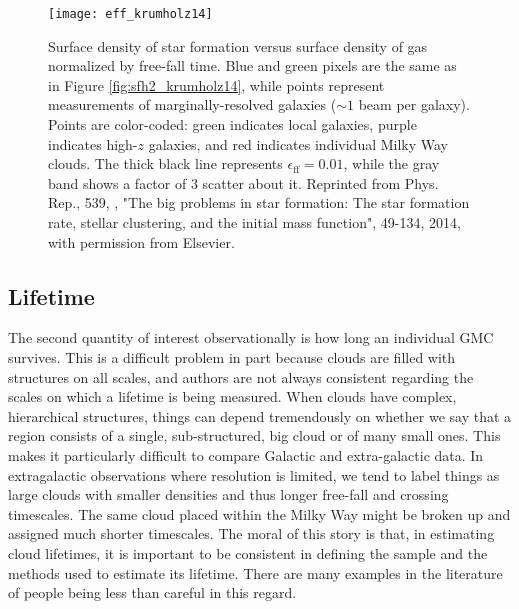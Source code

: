 \begin{figure}
\texttt{[image: eff\_krumholz14]}
\caption[Surface density of star formation versus surface density of gas normalized by free-fall time]{
\label{fig:eff_krumholz14}
Surface density of star formation versus surface density of gas normalized by free-fall time. Blue and green pixels are the same as in Figure \ref{fig:sfh2_krumholz14}, while points represent measurements of marginally-resolved galaxies ($\sim 1$ beam per galaxy). Points are color-coded: green indicates local galaxies, purple indicates high-$z$ galaxies, and red indicates individual Milky Way clouds. The thick black line represents $\epsilon_{\mathrm{ff}} = 0.01$, while the gray band shows a factor of 3 scatter about it. Reprinted from Phys. Rep., 539, \citeauthor{krumholz14c}, "The big problems in star formation: The star formation rate, stellar clustering, and the initial mass function", 49-134, 2014, with permission from Elsevier.
}
\end{figure}

\subsection{Lifetime}

The second quantity of interest observationally is how long an individual GMC survives. This is a difficult problem in part because clouds are filled with structures on all scales, and authors are not always consistent regarding the scales on which a lifetime is being measured. When clouds have complex, hierarchical structures, things can depend tremendously on whether we say that a region consists of a single, sub-structured, big cloud or of many small ones. This makes it particularly difficult to compare Galactic and extra-galactic data. In extragalactic observations where resolution is limited, we tend to label things as large clouds with smaller densities and thus longer free-fall and crossing timescales. The same cloud placed within the Milky Way might be broken up and assigned much shorter timescales. The moral of this story is that, in estimating cloud lifetimes, it is important to be consistent in defining the sample and the methods used to estimate its lifetime. There are many examples in the literature of people being less than careful in this regard.

